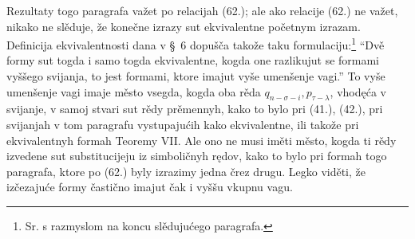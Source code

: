 \documentclass[11pt]{article}
\begin{document}
Rezultaty togo paragrafa važet po relacijah (62.); ale ako relacije (62.) ne važet, nikako ne slěduje, že konečne izrazy sut ekvivalentne početnym izrazam. Definicija ekvivalentnosti dana v \S\ 6 dopušča takože taku formulaciju:\footnote{Sr. s razmyslom na koncu slědujućego paragrafa.} ``Dvě formy sut togda i samo togda ekvivalentne, kogda one razlikujut se formami vyššego svijanja, to jest formami, ktore imajut vyše umenšenje vagi.'' To vyše umenšenje vagi imaje město vsegda, kogda oba rěda $q_{n-\sigma-i},p_{\tau-\lambda}$, vhodęća v svijanje, v samoj stvari sut rědy prěmennyh, kako to bylo pri (41.), (42.), pri svijanjah v tom paragrafu vystupajućih kako ekvivalentne, ili takože pri ekvivalentnyh formah Teoremy VII. Ale ono ne musi iměti město, kogda ti rědy izvedene sut substitucijeju iz simboličnyh rędov, kako to bylo pri formah togo paragrafa, ktore po (62.) byly izrazimy jedna črez drugu. Legko viděti, že izčezajuće formy častično imajut čak i vyššu vkupnu vagu.
\end{document}
